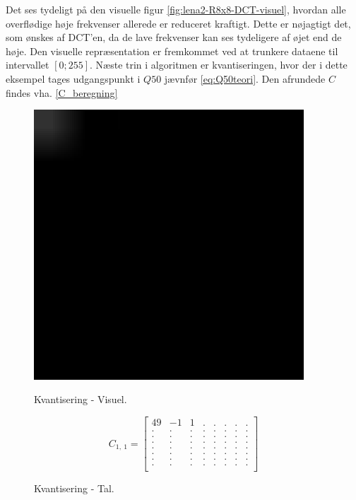 Det ses tydeligt på den visuelle figur \ref{fig:lena2-R8x8-DCT-visuel}, hvordan alle overflødige høje frekvenser allerede er reduceret kraftigt. Dette er nøjagtigt det, som ønskes af DCT'en, da de lave frekvenser kan ses tydeligere af øjet end de høje. Den visuelle repræsentation er fremkommet ved at trunkere dataene til intervallet $[0;255]$. Næste trin i algoritmen er kvantiseringen, hvor der i dette eksempel tages udgangspunkt i $Q50$ jævnfør \vref{eq:Q50teori}. Den afrundede $C$ findes vha. \vref{C_beregning}
\begin{figure}[!h]
\begin{minipage}[b]{0.25\linewidth}
\centering
\includegraphics[width=0.9\textwidth]{Billeder/LenaAnvendelse/RED8x8/lena3-R8x8-quantization.png}
\caption{Kvantisering - Visuel.}
\label{fig:lena3-R8x8-quantization-visuel}
\end{minipage}
\hspace{0.5cm}
\begin{minipage}[b]{0.40\linewidth}
\centering
\[C_{1,\ 1}=\begin{bmatrix}
49 & -1 & 1 & . & . & . & . & . \\
.  & .  & . & . & . & . & . & . \\
.  & .  & . & . & . & . & . & . \\
.  & .  & . & . & . & . & . & . \\
.  & .  & . & . & . & . & . & . \\
.  & .  & . & . & . & . & . & . \\
.  & .  & . & . & . & . & . & . \\
.  & .  & . & . & . & . & . & . \\
\end{bmatrix}\]
\caption{Kvantisering - Tal.}
\label{fig:lena3-R8x8-quantization-matrix}
\end{minipage}
\end{figure}
